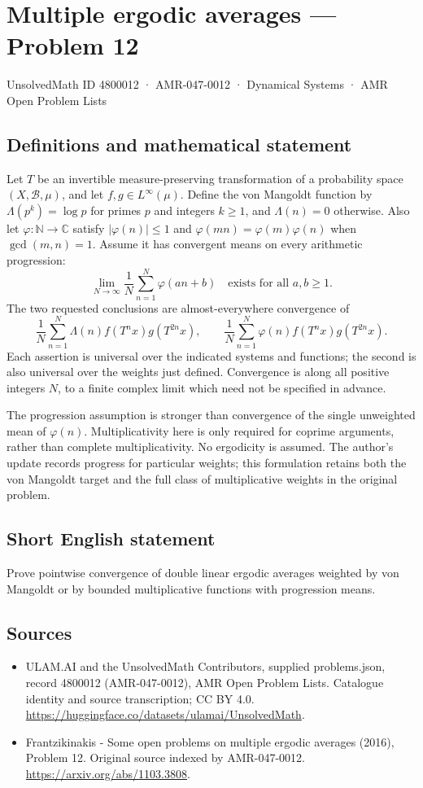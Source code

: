 \documentclass[11pt,a4paper]{article}
\begin{document}
\section*{Multiple ergodic averages — Problem 12}\label{4800012}
{\small UnsolvedMath ID 4800012 · AMR-047-0012 · Dynamical Systems · AMR Open Problem Lists}
\subsection{Definitions and mathematical statement}
Let $T$ be an invertible measure-preserving transformation
of a probability space $(X,\mathcal B,\mu)$, and let
$f,g\in L^\infty(\mu)$. Define the von Mangoldt function
by $\Lambda(p^k)=\log p$ for primes $p$ and integers
$k\ge1$, and $\Lambda(n)=0$ otherwise.
Also let $\varphi:\mathbb N\to\mathbb C$ satisfy
$|\varphi(n)|\le1$ and
$\varphi(mn)=\varphi(m)\varphi(n)$ when $\gcd(m,n)=1$.
Assume it has convergent means on every arithmetic
progression:
\[
      \lim_{N\to\infty}\frac1N\sum_{n=1}^N
                      \varphi(an+b)\quad\text{exists for all }a,b\ge1.
\]
The two requested conclusions are almost-everywhere
convergence of
\[
 \frac1N\sum_{n=1}^N\Lambda(n)f(T^n x)g(T^{2n}x),
 \qquad
 \frac1N\sum_{n=1}^N\varphi(n)f(T^n x)g(T^{2n}x).
\]
Each assertion is universal over the indicated systems
and functions; the second is also universal over the
weights just defined. Convergence is along all positive
integers $N$, to a finite complex limit which need not
be specified in advance.

The progression assumption is stronger than convergence
of the single unweighted mean of $\varphi(n)$.
Multiplicativity here is only required for coprime
arguments, rather than complete multiplicativity. No
ergodicity is assumed. The author's update records
progress for particular weights; this formulation
retains both the von Mangoldt target and the full
class of multiplicative weights in the original problem.
\subsection{Short English statement}
Prove pointwise convergence of double linear ergodic averages weighted by von Mangoldt or by bounded multiplicative functions with progression means.
\subsection{Sources}
\begin{itemize}
\item[S1] ULAM.AI and the UnsolvedMath Contributors, supplied problems.json, record 4800012 (AMR-047-0012), AMR Open Problem Lists. Catalogue identity and source transcription; CC BY 4.0.
\url{https://huggingface.co/datasets/ulamai/UnsolvedMath}.
\item[S2] Frantzikinakis - Some open problems on multiple ergodic averages (2016), Problem 12. Original source indexed by AMR-047-0012.
\url{https://arxiv.org/abs/1103.3808}.
\end{itemize}
\end{document}
